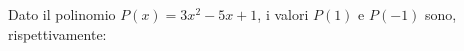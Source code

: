Dato il polinomio $\displaystyle P(x) = 3x^2 - 5x +1$, 
i valori $P(1)$ e $P(-1)$ sono, rispettivamente:
